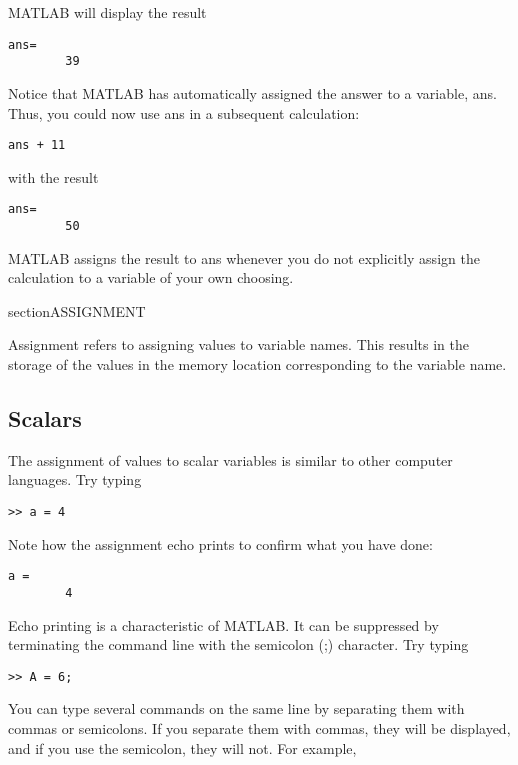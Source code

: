 \documentclass[../main.tex]{subfiles}
\begin{document}
MATLAB will display the result
	
\begin{lstlisting}[frame=none, numbers=none]
	ans=
		39
\end{lstlisting}

Notice that MATLAB has automatically assigned the answer to a variable, ans. Thus, you
could now use ans in a subsequent calculation:

\begin{lstlisting}[frame=none, numbers=none]
	ans + 11
\end{lstlisting}

with the result

\begin{lstlisting}[frame=none, numbers=none]
	ans=
		50
\end{lstlisting}

MATLAB assigns the result to ans whenever you do not explicitly assign the calculation
to a variable of your own choosing.

section{ASSIGNMENT}

Assignment refers to assigning values to variable names. This results in the storage of the
values in the memory location corresponding to the variable name.

\subsection{Scalars}
The assignment of values to scalar variables is similar to other computer languages.
Try typing
\begin{lstlisting}[frame=none, numbers=none]
	>> a = 4
\end{lstlisting}

Note how the assignment echo prints to confirm what you have done:
\begin{lstlisting}[frame=none, numbers=none]
	a = 
		4
\end{lstlisting}

Echo printing is a characteristic of MATLAB. It can be suppressed by terminating the command line with the semicolon (;) character. Try typing
\begin{lstlisting}[frame=none, numbers=none]
	>> A = 6;
\end{lstlisting}

You can type several commands on the same line by separating them with commas or
semicolons. If you separate them with commas, they will be displayed, and if you use the
semicolon, they will not. For example,
\end{document}
